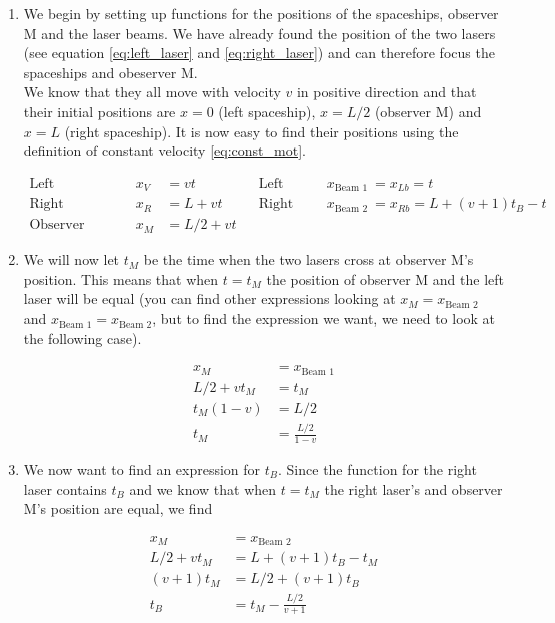 \documentclass[a4paper,10pt,english]{article}
\begin{document}
\begin{enumerate}
\item We begin by setting up functions for the positions of the spaceships, observer M and the laser beams. We have already found the position of the two lasers (see equation \ref{eq:left_laser} and \ref{eq:right_laser}) and can therefore focus the spaceships and obeserver M.
\\
We know that they all move with velocity $v$ in positive direction and that their initial positions are $x=0$ (left spaceship), $x=L/2$ (observer M) and $x=L$ (right spaceship). It is now easy to find their positions using the definition of constant velocity \ref{eq:const_mot}.

\begin{align*}
\text{Left spaceship:}& &&& x_{V}&=vt && \text{Left laser:}& && x_{\text{Beam 1}}&=x_{Lb}=t\\
\text{Right spaceship:}& &&& x_{R}&=L+vt && \text{Right laser:}& && x_{\text{Beam 2}}&=x_{Rb}=L+(v+1)t_{B}-t\\
\text{Observer M:}& &&& x_{M}&=L/2+vt
\end{align*}

\item We will now let $t_{M}$ be the time when the two lasers cross at observer M's position. This means that when $t=t_{M}$ the position of observer M and the left laser will be equal (you can find other expressions looking at $x_{M}=x_{\text{Beam 2}}$ and $x_{\text{Beam 1}}=x_{\text{Beam 2}}$, but to find the expression we want, we need to look at the following case).

\begin{align*}
x_{M}&=x_{\text{Beam 1}}\\
L/2+vt_{M}&=t_{M}\\
t_{M}(1-v)&=L/2\\
t_{M}&=\frac{L/2}{1-v}
\end{align*}

\item We now want to find an expression for $t_{B}$. Since the function for the right laser contains $t_{B}$ and we know that when $t=t_{M}$ the right laser's and observer M's position are equal, we find

\begin{align*}
x_{M}&=x_{\text{Beam 2}}\\
L/2+vt_{M}&=L+(v+1)t_{B}-t_{M}\\
(v+1)t_{M}&=L/2+(v+1)t_{B}\\
t_{B}&=t_{M}-\frac{L/2}{v+1}
\end{align*}


\end{enumerate}
\end{document}
